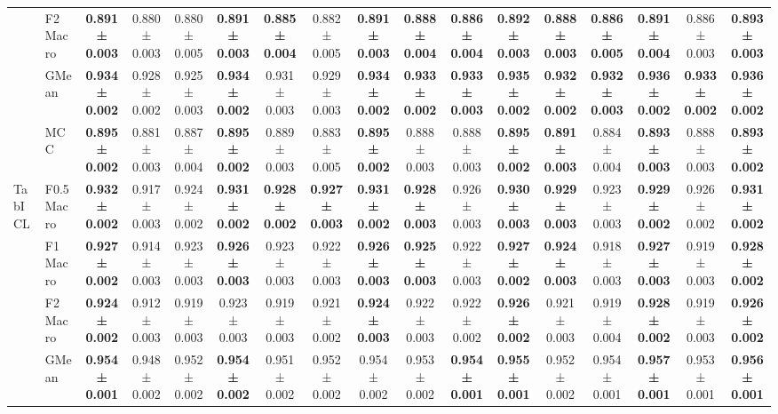 \begin{table}[H]
{\begin{tabular}{llccccccccccccccc}
 & F2 Macro & \textbf{0.891 ± 0.003} & 0.880 ± 0.003 & 0.880 ± 0.005 & \textbf{0.891 ± 0.003} & \textbf{0.885 ± 0.004} & 0.882 ± 0.005 & \textbf{0.891 ± 0.003} & \textbf{0.888 ± 0.004} & \textbf{0.886 ± 0.004} & \textbf{0.892 ± 0.003} & \textbf{0.888 ± 0.003} & \textbf{0.886 ± 0.005} & \textbf{0.891 ± 0.004} & 0.886 ± 0.003 & \textbf{0.893 ± 0.003} \\
 & GMean & \textbf{0.934 ± 0.002} & 0.928 ± 0.002 & 0.925 ± 0.003 & \textbf{0.934 ± 0.002} & 0.931 ± 0.003 & 0.929 ± 0.003 & \textbf{0.934 ± 0.002} & \textbf{0.933 ± 0.002} & \textbf{0.933 ± 0.003} & \textbf{0.935 ± 0.002} & \textbf{0.932 ± 0.002} & \textbf{0.932 ± 0.003} & \textbf{0.936 ± 0.002} & \textbf{0.933 ± 0.002} & \textbf{0.936 ± 0.002} \\
 & MCC & \textbf{0.895 ± 0.002} & 0.881 ± 0.003 & 0.887 ± 0.004 & \textbf{0.895 ± 0.002} & 0.889 ± 0.003 & 0.883 ± 0.005 & \textbf{0.895 ± 0.002} & 0.888 ± 0.003 & 0.888 ± 0.003 & \textbf{0.895 ± 0.002} & \textbf{0.891 ± 0.003} & 0.884 ± 0.004 & \textbf{0.893 ± 0.003} & 0.888 ± 0.003 & \textbf{0.893 ± 0.002} \\
\cline{1-17}
\multirow[t]{5}{*}{TabICL} & F0.5 Macro & \textbf{0.932 ± 0.002} & 0.917 ± 0.003 & 0.924 ± 0.002 & \textbf{0.931 ± 0.002} & \textbf{0.928 ± 0.002} & \textbf{0.927 ± 0.003} & \textbf{0.931 ± 0.002} & \textbf{0.928 ± 0.003} & 0.926 ± 0.003 & \textbf{0.930 ± 0.003} & \textbf{0.929 ± 0.003} & 0.923 ± 0.003 & \textbf{0.929 ± 0.002} & 0.926 ± 0.002 & \textbf{0.931 ± 0.002} \\
 & F1 Macro & \textbf{0.927 ± 0.002} & 0.914 ± 0.003 & 0.923 ± 0.003 & \textbf{0.926 ± 0.003} & 0.923 ± 0.003 & 0.922 ± 0.003 & \textbf{0.926 ± 0.003} & \textbf{0.925 ± 0.003} & 0.922 ± 0.003 & \textbf{0.927 ± 0.002} & \textbf{0.924 ± 0.003} & 0.918 ± 0.003 & \textbf{0.927 ± 0.003} & 0.919 ± 0.003 & \textbf{0.928 ± 0.002} \\
 & F2 Macro & \textbf{0.924 ± 0.002} & 0.912 ± 0.003 & 0.919 ± 0.003 & 0.923 ± 0.003 & 0.919 ± 0.003 & 0.921 ± 0.002 & \textbf{0.924 ± 0.003} & 0.922 ± 0.003 & 0.922 ± 0.002 & \textbf{0.926 ± 0.002} & 0.921 ± 0.003 & 0.919 ± 0.004 & \textbf{0.928 ± 0.002} & 0.919 ± 0.003 & \textbf{0.926 ± 0.002} \\
 & GMean & \textbf{0.954 ± 0.001} & 0.948 ± 0.002 & 0.952 ± 0.002 & \textbf{0.954 ± 0.002} & 0.951 ± 0.002 & 0.952 ± 0.002 & 0.954 ± 0.002 & 0.953 ± 0.002 & \textbf{0.954 ± 0.001} & \textbf{0.955 ± 0.001} & 0.952 ± 0.002 & 0.954 ± 0.001 & \textbf{0.957 ± 0.001} & 0.953 ± 0.001 & \textbf{0.956 ± 0.001} \\

\end{tabular}}
\end{table}
